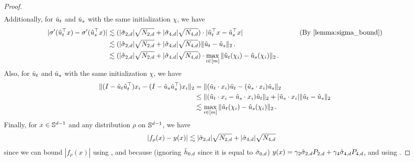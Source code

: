 \begin{proof}
\begin{align}
\end{align}
Additionally, for $\hat{u}_t$ and $\hat{u}_s$ with the same initialization $\chi$, we have
\begin{align}
|\sigma'(\uhat_t^\top x) - \sigma'(\uhat_s^\top x)|
& \lesssim (|\sigmaCoeffTwo| \sqrt{N_{2, d}} + |\sigmaCoeffFour| \sqrt{N_{4, d}}) \cdot |\uhat_t^\top x - \uhat_s^\top x|
& \tag{By \Cref{lemma:sigma_bound}} \\
& \lesssim (|\sigmaCoeffTwo| \sqrt{N_{2, d}} + |\sigmaCoeffFour| \sqrt{N_{4, d}}) \|\uhat_t - \uhat_s\|_2 \period \\
& \lesssim (|\sigmaCoeffTwo| \sqrt{N_{2, d}} + |\sigmaCoeffFour| \sqrt{N_{4, d}}) \cdot \max_{i \in [m]} \|\uhat_t(\chi_i) - \uhat_s(\chi_i)\|_2 \period \label{eq:triangle_ineq_comp_2}
\end{align}
Also, for $\hat{u}_t$ and $\hat{u}_s$ with the same initialization $\chi$, we have
\begin{align}
\|(I - \hat{u}_t \hat{u}_t^\top) x_i - (I - \hat{u}_s \hat{u}_s^\top)x_i \|_2
& = \|(\hat{u}_t \cdot x_i) \hat{u}_t - (\hat{u}_s \cdot x_i) \hat{u}_s\|_2 \\
& \leq \|(\hat{u}_t \cdot x_i - \hat{u}_s \cdot x_i) \hat{u}_t\|_2 + |\hat{u}_s \cdot x_i| \|\hat{u}_t - \hat{u}_s\|_2 \\
& \lesssim \max_{i \in [m]} \|\hat{u}_t(\chi_i) - \hat{u}_s(\chi_i)\|_2 \,. \label{eq:triangle_ineq_comp_3}
\end{align}
Finally, for $x \in \mathbb{S}^{d - 1}$ and any distribution $\rho$ on $\mathbb{S}^{d - 1}$, we have
\begin{align}
|f_\rho(x) - y(x)|
& \lesssim |\hat{\sigma}_{2, d}| \sqrt{N_{2, d}} + |\hat{\sigma}_{4, d}| \sqrt{N_{4, d}} \label{eq:triangle_ineq_comp_4}
\end{align}
since we can bound $|f_\rho(x)|$ using , and because (ignoring $\hat{h}_{0, d}$ since it is equal to $\hat{\sigma}_{0, d}$) $y(x) = \gamma_2 \hat{\sigma}_{2, d} {P_{2, d}} + \gamma_4 \hat{\sigma}_{4, d} {P_{4, d}}$, and using .


\end{proof}
